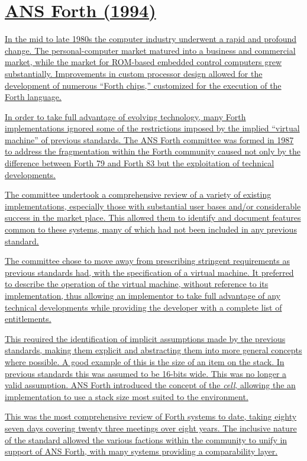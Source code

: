 \section[ANS Forth (1994)]{\uline{ANS Forth (1994)}} %

\uline{%
In the mid to late 1980s the computer industry underwent a rapid and
profound change.  The personal-com\-put\-er market matured into a business
and commercial market, while the market for ROM-based embedded control
computers grew substantially.  Improvements in custom processor design
allowed for the de\-vel\-op\-ment of numerous ``Forth chips,'' customized
for the execution of the Forth language.}

\uline{%
In order to take full advantage of evolving technology, many Forth
implementations ignored some of the restrictions imposed by the
implied ``virtual machine'' of previous standards.
The ANS Forth committee was formed in 1987 to address the fragmentation
within the Forth community caused not only by the difference between
Forth 79 and Forth 83 but the exploitation of technical developments.}

\uline{%
The committee undertook a comprehensive review of a variety of existing
implementations, especially those with substantial user bases and/or
considerable success in the market place.  This allowed them to identify
and document features common to these systems, many of which had not been
included in any previous standard.}

\uline{%
The committee chose to move away from prescribing stringent requirements
as previous standards had, with the specification of a virtual machine.
It preferred to describe the operation of the virtual machine, without
reference to its implementation, thus allowing an implementor to take
full advantage of any technical developments while providing the
developer with a complete list of entitlements.}

\uline{%
This required the identification of implicit assumptions made by the
previous standards, making them explicit and abstracting them into
more general concepts where possible.  A good example of this is the
size of an item on the stack.  In previous standards this was assumed
to be 16-bits wide.  This was no longer a valid assumption.  ANS Forth
introduced the concept of the \emph{cell}, allowing the an implementation
to use a stack size most suited to the environment.}

\uline{%
This was the most comprehensive review of Forth systems to date, taking
eighty seven days covering twenty three meetings over eight years.
The inclusive nature of the standard allowed the various factions within
the community to unify in support of ANS Forth, with many systems
providing a comparability layer.}

